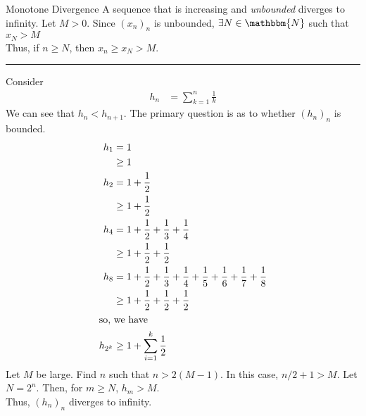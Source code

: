 \documentclass[10pt]{extarticle}
\newcommand{\N}{\mathbbm{N}}
\begin{document}
  \begin{problem}{Monotone Divergence}
    A sequence that is increasing and \textsl{unbounded} diverges to infinity.
    \tcblower
    Let $M > 0$. Since $\left(x_{n}\right)_n$ is unbounded, $\exists N\in\N$ such that $x_{N} > M$\\

    Thus, if $n \geq N$, then $x_{n} \geq x_{N} > M$.\\
    \vspace{4pt}
    \rule{\textwidth}{0.4pt}
    \vspace{4pt}
    Consider
    \begin{align*}
      h_n &= \sum_{k=1}^{n} \frac{1}{k}
    \end{align*}
    We can see that $h_{n} < h_{n+1}$. The primary question is as to whether $(h_n)_n$ is bounded.
    \begin{align*}
      h_{1} &= 1 \\&\geq 1\\
      h_{2} &= 1 + \frac{1}{2}\\ &\geq 1 + \frac{1}{2}\\
      h_{4} &= 1 + \frac{1}{2} + \frac{1}{3} + \frac{1}{4}\\ &\geq 1 + \frac{1}{2} + \frac{1}{2}\\
      h_{8} &= 1 + \frac{1}{2} + \frac{1}{3} + \frac{1}{4} + \frac{1}{5} + \frac{1}{6} + \frac{1}{7} + \frac{1}{8}\\
            &\geq 1 + \frac{1}{2}  + \frac{1}{2} + \frac{1}{2}\\
            \shortintertext{so, we have}
      h_{2^k} &\geq 1 + \sum_{i=1}^{k}\frac{1}{2}\\
    \end{align*}
    Let $M$ be large. Find $n$ such that $n > 2(M-1)$. In this case, $n/2 + 1 > M$. Let $N = 2^n$. Then, for $m \geq N$, $h_{m} > M$.\\

    Thus, $(h_n)_n$ diverges to infinity.
  \end{problem}
\end{document}

